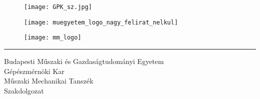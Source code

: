 \begin{titlepage}
	\begin{figure}[h]
		\centering
		\begin{minipage}[h]{0.15\textwidth}
			\centering
			\texttt{[image: GPK\_sz.jpg]}
		\end{minipage}
		\quad %
		\begin{minipage}[h]{0.6\textwidth}
			\centering
			\texttt{[image: muegyetem\_logo\_nagy\_felirat\_nelkul]}
		\end{minipage}
		\quad %
		\begin{minipage}[h]{0.15\textwidth}
			\centering
			\texttt{[image: mm\_logo]}
		\end{minipage}
	\end{figure}
	\hrule
	\vspace{1em}
	{\large Budapesti Műszaki és Gazdaságtudományi Egyetem}\\[0.2em]%
	{\large Gépészmérnöki Kar}\\[0.2em] %
	{\large Műszaki Mechanikai Tanszék}\\[0.2em] %
	{\large Szakdolgozat}  %
	
	\vspace{15em}
	

\end{titlepage}
